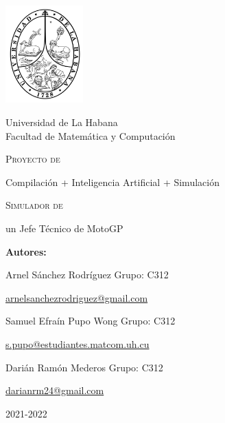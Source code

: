 \documentclass[12pt, letterpaper,spanish]{article}
\theoremstyle{definition}
\theoremstyle{remark}
\begin{document}
	
\begin{titlepage}
	\begin{center}
		\includegraphics[width = 3cm]{escudoUH} 
	\end{center}
	\begin{center}
		Universidad de La Habana \\\vspace{0.2cm} Facultad de Matemática y Computación
	\end{center}
	\centering
	\vspace{1cm} \par
	{\scshape\Large Proyecto de \par Compilación + Inteligencia Artificial + Simulación\par}
	\vspace{5mm} \par
	{\scshape\Huge Simulador de \par un Jefe Técnico de MotoGP\par}
	\vspace{5mm} \par
	\vfill
	{\Large \textbf{Autores:} \par}
	{\large Arnel Sánchez Rodríguez \space Grupo: C312 \par}
	\href{mailto:arnelsanchezrodriguez@gmail.com}{arnelsanchezrodriguez@gmail.com}\par
	\vspace{3mm} \par
	{\large Samuel Efraín Pupo Wong \space Grupo: C312 \par}
	\href{mailto:s.pupo@estudiantes.matcom.uh.cu}{s.pupo@estudiantes.matcom.uh.cu}
	\vspace{3mm} \par
	{\large Darián Ramón Mederos \space Grupo: C312 \par}
	\href{mailto:darianrm24@gmail.com}{darianrm24@gmail.com}
	\vspace{3mm} \par
	\vfill
	{\Large 2021-2022 \par}
\end{titlepage}	
\pagebreak
\tableofcontents
\pagebreak
\end{document}
